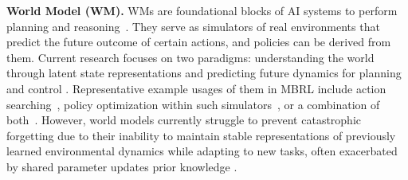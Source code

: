 {\bf World Model (WM).} WMs are foundational blocks of AI systems to perform planning and reasoning~\cite{ha2018world}. They serve as simulators of real environments that predict the future outcome of certain actions, and policies can be derived from them. Current research focuses on two paradigms: understanding the world through latent state representations \cite{hansen2023td, Zhou2024RoboDreamerLC} and predicting future dynamics for planning and control \cite{Ma2024DoTW, Wang2024AD3IA}. Representative example usages of them in MBRL include action searching~\cite{schrittwieser2020mastering, nayakLLaMARLongHorizonPlanning2025}, policy optimization within such simulators~\cite{feinberg2018model, hafner2019dream}, or a combination of both~\cite{chitnis2023iql, hansen2023td}. However, world models currently struggle to prevent catastrophic forgetting \cite{Mattes2023HierosHI} due to their inability to maintain stable representations of previously learned environmental dynamics while adapting to new tasks, often exacerbated by shared parameter updates prior knowledge \cite{Sun2024LearningLD}.
